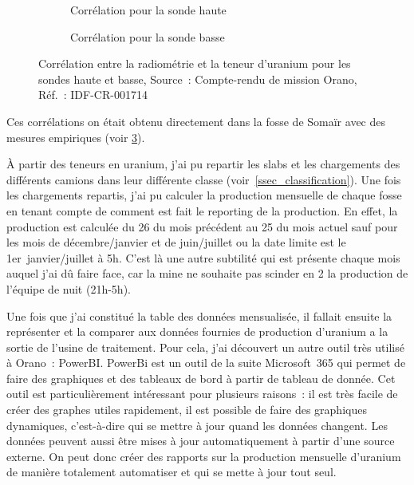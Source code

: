 \begin{figure}
    \centering
    \begin{subfigure}{0.45\textwidth}
        \centering
        \caption{Corrélation pour la sonde haute}
        \label{fig_correlation_sonde_haute}
    \end{subfigure}
    \begin{subfigure}{0.45\textwidth}
        \centering
        \caption{Corrélation pour la sonde basse}
        \label{fig_correlation_sonde_basse}
    \end{subfigure}
    \caption[Corrélation entre la radiométrie et la teneur d'uranium]{Corrélation entre la radiométrie et la teneur d'uranium pour les sondes haute et basse, Source~: Compte-rendu de mission Orano, Réf.~: IDF-CR-001714}
    \label{fig_correlation_sonde}
\end{figure}
Ces corrélations on était obtenu directement dans la fosse de Somaïr avec des mesures empiriques (voir \cref{fig_correlation_sonde}).

À partir des teneurs en uranium, j'ai pu repartir les slabs et les chargements des différents camions dans leur différente classe (voir~\cref{ssec_classification}). Une fois les chargements repartis, j'ai pu calculer la production mensuelle de chaque fosse en tenant compte de comment est fait le reporting de la production. En effet, la production est calculée du 26 du mois précédent au 25 du mois actuel sauf pour les mois de décembre/janvier et de juin/juillet ou la date limite est le 1er~janvier/juillet à 5h. C'est là une autre subtilité qui est présente chaque mois auquel j'ai dû faire face, car la mine ne souhaite pas scinder en 2 la production de l'équipe de nuit (21h-5h).

Une fois que j'ai constitué la table des données mensualisée, il fallait ensuite la représenter et la comparer aux données fournies de production d'uranium a la sortie de l'usine de traitement. Pour cela, j'ai découvert un autre outil très utilisé à Orano~: PowerBI. PowerBi est un outil de la suite Microsoft~365 qui permet de faire des graphiques et des tableaux de bord à partir de tableau de donnée. Cet outil est particulièrement intéressant pour plusieurs raisons~: il est très facile de créer des graphes utiles rapidement, il est possible de faire des graphiques dynamiques, c'est-à-dire qui se mettre à jour quand les données changent. Les données peuvent aussi être mises à jour automatiquement à partir d'une source externe. On peut donc créer des rapports sur la production mensuelle d'uranium de manière totalement automatiser et qui se mette à jour tout seul.